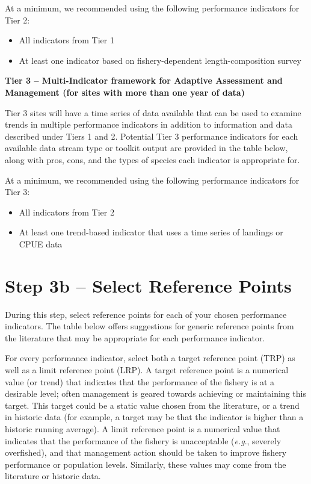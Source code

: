 \documentclass[]{book}
\begin{document}
At a minimum, we recommended using the following performance indicators
for Tier 2:

\begin{itemize}
\item
  All indicators from Tier 1
\item
  At least one indicator based on fishery-dependent length-composition
  survey
\end{itemize}

\textbf{Tier 3 -- Multi-Indicator framework for Adaptive Assessment and
Management (for sites with more than one year of data)}

Tier 3 sites will have a time series of data available that can be used
to examine trends in multiple performance indicators in addition to
information and data described under Tiers 1 and 2. Potential Tier 3
performance indicators for each available data stream type or toolkit
output are provided in the table below, along with pros, cons, and the
types of species each indicator is appropriate for.

At a minimum, we recommended using the following performance indicators
for Tier 3:

\begin{itemize}
\item
  All indicators from Tier 2
\item
  At least one trend-based indicator that uses a time series of landings
  or CPUE data
\end{itemize}

\hypertarget{Step3b}{\section{Step 3b -- Select Reference
Points}\label{Step3b}}

During this step, select reference points for each of your chosen
performance indicators. The table below offers suggestions for generic
reference points from the literature that may be appropriate for each
performance indicator.

For every performance indicator, select both a target reference point
(TRP) as well as a limit reference point (LRP). A target reference point
is a numerical value (or trend) that indicates that the performance of
the fishery is at a desirable level; often management is geared towards
achieving or maintaining this target. This target could be a static
value chosen from the literature, or a trend in historic data (for
example, a target may be that the indicator is higher than a historic
running average). A limit reference point is a numerical value that
indicates that the performance of the fishery is unacceptable
(\emph{e.g}., severely overfished), and that management action should be
taken to improve fishery performance or population levels. Similarly,
these values may come from the literature or historic data.
\end{document}
